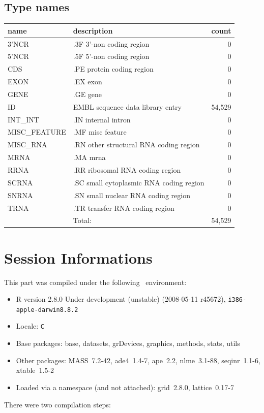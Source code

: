 \documentclass{article}
\begin{document}
\begin{Schunk}
\subsection{Type names}
\noindent\begin{tabular}{llr}
\hline \hline
name & description & count \\
\hline
3'NCR  &  .3F  3'-non coding region  &  0 \\
5'NCR  &  .5F  5'-non coding region  &  0 \\
CDS  &  .PE protein coding region  &  0 \\
EXON  &  .EX exon  &  0 \\
GENE  &  .GE gene  &  0 \\
ID  &  EMBL sequence data library entry  &  54,529 \\
INT\_INT  &  .IN  internal intron  &  0 \\
MISC\_FEATURE  &  .MF misc feature  &  0 \\
MISC\_RNA  &  .RN other structural RNA coding region  &  0 \\
MRNA  &  .MA mrna  &  0 \\
RRNA  &  .RR ribosomal RNA coding region  &  0 \\
SCRNA  &  .SC small cytoplasmic RNA coding region  &  0 \\
SNRNA  &  .SN small nuclear RNA coding region  &  0 \\
TRNA  &  .TR transfer RNA coding region  &  0 \\
\hline
 & Total: & 54,529 \\
\hline \hline
\end{tabular}\end{Schunk}


\section*{Session Informations}

This part was compiled under the following \Rlogo{}~environment:

\begin{itemize}
  \item R version 2.8.0 Under development (unstable) (2008-05-11 r45672), \verb|i386-apple-darwin8.8.2|
  \item Locale: \verb|C|
  \item Base packages: base, datasets, grDevices, graphics, methods,
    stats, utils
  \item Other packages: MASS~7.2-42, ade4~1.4-7, ape~2.2,
    nlme~3.1-88, seqinr~1.1-6, xtable~1.5-2
  \item Loaded via a namespace (and not attached): grid~2.8.0,
    lattice~0.17-7
\end{itemize}
There were two compilation steps:
\end{document}
